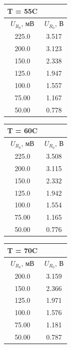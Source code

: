 \begin{equation*}
\end{equation*}

\begin{minipage}{.3\textwidth}

	\begin{center}
	\begin{tabular}{|c|c|}
	\hline
	T = 55C&\\
	\hline
	$U_{R_0}$, мВ&$U_{R_0}$, \linebreak В \\
	\hline
225.0&3.517\\
\hline
200.0&3.123\\
\hline
150.0&2.338\\
\hline
125.0&1.947\\
\hline
100.0&1.557\\
\hline
75.00&1.167\\
\hline
50.00&0.778\\
\hline
	\end{tabular}
	\end{center}
\end{minipage}
\begin{minipage}{.3\textwidth}

	\begin{center}
	\begin{tabular}{|c|c|}
	\hline
	T = 60C&\\
	\hline
	$U_{R_0}$, мВ&$U_{R_0}$, \linebreak В \\
	\hline
225.0&3.508\\
\hline
200.0&3.115\\
\hline
150.0&2.332\\
\hline
125.0&1.942\\
\hline
100.0&1.554\\
\hline
75.00&1.165\\
\hline
50.00&0.776\\
\hline
	\end{tabular}
	\end{center}
\end{minipage}
\begin{minipage}{.3\textwidth}

	\begin{center}
	\begin{tabular}{|c|c|}
	\hline
	T = 70C&\\
	\hline
	$U_{R_0}$, мВ&$U_{R_0}$, \linebreak В \\
\hline
200.0&3.159\\
\hline
150.0&2.366\\
\hline
125.0&1.971\\
\hline
100.0&1.576\\
\hline
75.00&1.181\\
\hline
50.00&0.787\\
\hline
	\end{tabular}
	\end{center}
\end{minipage}

